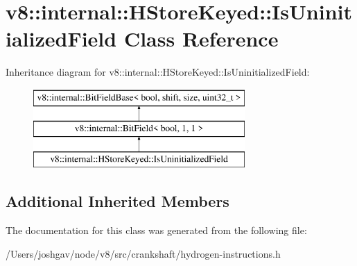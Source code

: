 \hypertarget{classv8_1_1internal_1_1_h_store_keyed_1_1_is_uninitialized_field}{}\section{v8\+:\+:internal\+:\+:H\+Store\+Keyed\+:\+:Is\+Uninitialized\+Field Class Reference}
\label{classv8_1_1internal_1_1_h_store_keyed_1_1_is_uninitialized_field}
Inheritance diagram for v8\+:\+:internal\+:\+:H\+Store\+Keyed\+:\+:Is\+Uninitialized\+Field\+:\begin{figure}[H]
\begin{center}
\leavevmode
\includegraphics[height=3.000000cm]{classv8_1_1internal_1_1_h_store_keyed_1_1_is_uninitialized_field}
\end{center}
\end{figure}
\subsection*{Additional Inherited Members}


The documentation for this class was generated from the following file\+:\begin{DoxyCompactItemize}
\item 
/\+Users/joshgav/node/v8/src/crankshaft/hydrogen-\/instructions.\+h\end{DoxyCompactItemize}
